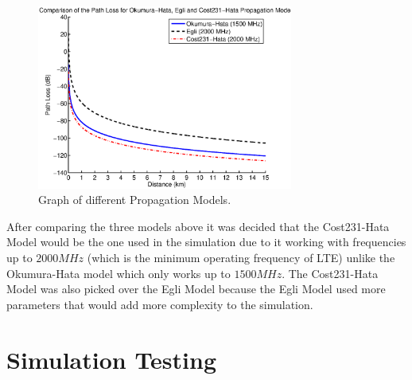 \begin{figure}[H]
  \begin{center}
    	  \includegraphics[width=0.75\textwidth]{figures/simulation/prop.eps}
    \end{center}
    \caption{Graph of different Propagation Models.}
    \label{fig:prop}
\end{figure}
After comparing the three models above it was decided that the Cost231-Hata Model would be the one used in the simulation due to it working with frequencies up to $2000 MHz$ (which is the minimum operating frequency of LTE) unlike the Okumura-Hata model which only works up to $1500 MHz$. The Cost231-Hata Model was also picked over the Egli Model because the Egli Model used more parameters that would add more complexity to the simulation.~\cite{chebil2011comparison, shabbir2011comparison}

\section{Simulation Testing}
